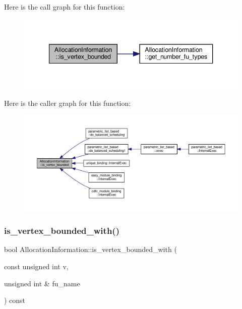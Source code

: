 Here is the call graph for this function\+:
\nopagebreak
\begin{figure}[H]
\begin{center}
\leavevmode
\includegraphics[width=340pt]{d7/d79/classAllocationInformation_adf7ae2a5e871e9c6ae0a858b5038c68d_cgraph}
\end{center}
\end{figure}
Here is the caller graph for this function\+:
\nopagebreak
\begin{figure}[H]
\begin{center}
\leavevmode
\includegraphics[width=350pt]{d7/d79/classAllocationInformation_adf7ae2a5e871e9c6ae0a858b5038c68d_icgraph}
\end{center}
\end{figure}
\mbox{\label{classAllocationInformation_a37ec8afd2ce39886932cfbf4127cccad}} 
\subsubsection{\texorpdfstring{is\+\_\+vertex\+\_\+bounded\+\_\+with()}{is\_vertex\_bounded\_with()}\hspace{0.1cm}{\footnotesize\ttfamily [1/2]}}
{\footnotesize\ttfamily bool Allocation\+Information\+::is\+\_\+vertex\+\_\+bounded\+\_\+with (\begin{DoxyParamCaption}\item[{const unsigned int}]{v,  }\item[{unsigned int \&}]{fu\+\_\+name }\end{DoxyParamCaption}) const}



